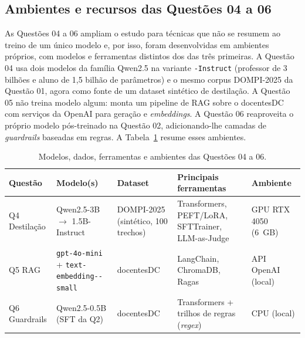 \subsection{Ambientes e recursos das Questões 04 a 06}
\label{sec:amb-q456}

As Questões 04 a 06 ampliam o estudo para técnicas que não se resumem ao treino de
um único modelo e, por isso, foram desenvolvidas em ambientes próprios, com modelos e
ferramentas distintos dos das três primeiras. A Questão 04 usa dois modelos da
família Qwen2.5 na variante \texttt{-Instruct} (professor de 3 bilhões e aluno de 1,5
bilhão de parâmetros) e o mesmo corpus DOMPI-2025 da Questão 01, agora como fonte de
um dataset sintético de destilação. A Questão 05 não treina modelo algum: monta um
pipeline de RAG sobre o docentesDC com serviços da OpenAI para geração e
\textit{embeddings}. A Questão 06 reaproveita o próprio modelo pós-treinado na
Questão 02, adicionando-lhe camadas de \textit{guardrails} baseadas em regras. A
Tabela~\ref{tab:amb-q456} resume esses ambientes.

\begin{table}[ht]
  \centering
  \caption{Modelos, dados, ferramentas e ambientes das Questões 04 a 06.}
  \label{tab:amb-q456}
  \footnotesize
  \begin{tabularx}{\textwidth}{@{}l
    >{\hsize=1.05\hsize\raggedright\arraybackslash}X
    >{\hsize=0.85\hsize\raggedright\arraybackslash}X
    >{\hsize=1.30\hsize\raggedright\arraybackslash}X
    >{\hsize=0.80\hsize\raggedright\arraybackslash}X@{}}
    \toprule
    \textbf{Questão} & \textbf{Modelo(s)} & \textbf{Dataset} & \textbf{Principais ferramentas} & \textbf{Ambiente} \\
    \midrule
    Q4 Destilação & Qwen2.5-3B $\rightarrow$ 1.5B-Instruct & DOMPI-2025 (sintético, 100 trechos) & Transformers, PEFT/LoRA, SFTTrainer, LLM-as-Judge & GPU RTX 4050 (6~GB) \\
    Q5 RAG & \texttt{gpt-4o-mini} \newline + \texttt{text-\allowbreak embedding-\allowbreak 3-\allowbreak small} & docentesDC & LangChain, ChromaDB, Ragas & API OpenAI (local) \\
    Q6 Guardrails & Qwen2.5-0.5B (SFT da Q2) & docentesDC & Transformers + trilhos de regras (\textit{regex}) & CPU (local) \\
    \bottomrule
  \end{tabularx}
\end{table}

